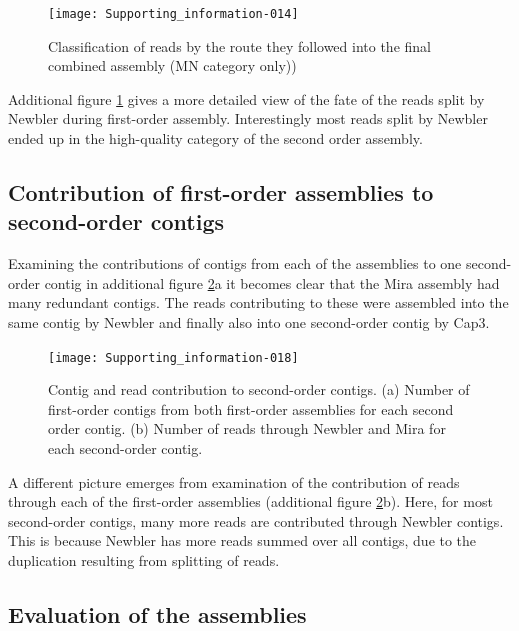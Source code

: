 \documentclass[12pt,a4paper]{article}
\begin{document}
\begin{figure}[H]
  \centering
  

\texttt{[image: Supporting\_information-014]}

\caption{Classification of reads by the route they followed into the
  final combined assembly (MN category only))}
\label{fig:venncat}
\end{figure}

Additional figure \ref{fig:venncat} gives a more detailed view of the fate of the
reads split by Newbler during first-order assembly. Interestingly most
reads split by Newbler ended up in the high-quality category of the
second order assembly.

\subsection{Contribution of first-order assemblies to second-order contigs}
\label{sec:contr-firs-order}

  

Examining the contributions of contigs from each of the assemblies to
one second-order contig in additional figure \ref{fig:rcp}a it becomes
clear that the Mira assembly had many redundant contigs. The reads
contributing to these were assembled into the same contig by Newbler
and finally also into one second-order contig by Cap3.


\begin{figure}[H]
  \centering

\texttt{[image: Supporting\_information-018]}


\caption[Contig and read contribution to second-order contigs.]{
  Contig and read contribution to second-order contigs. (a) Number of
  first-order contigs from both first-order assemblies for each second
  order contig. (b) Number of reads through Newbler and Mira for each
  second-order contig.}
\label{fig:rcp}
  
\end{figure}


A different picture emerges from examination of the contribution of
reads through each of the first-order assemblies (additional figure
\ref{fig:rcp}b).  Here, for most second-order contigs, many more reads
are contributed through Newbler contigs. This is because Newbler has
more reads summed over all contigs, due to the duplication resulting
from splitting of reads.

\newpage

\subsection{Evaluation of the assemblies}
\label{sec:eval-three-assembl}
\end{document}
